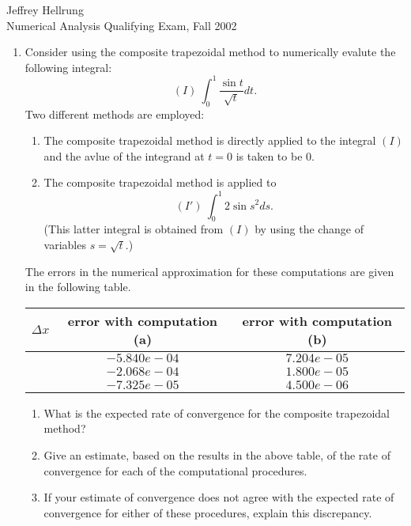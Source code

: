 \documentclass{article}
\begin{document}
\begin{flushright}
Jeffrey Hellrung \\
Numerical Analysis Qualifying Exam, Fall 2002 \\
\end{flushright}


\begin{enumerate}

\item Consider using the composite trapezoidal method to numerically evalute the following integral:
\[(I) \ \int_0^1 \frac{\sin t}{\sqrt{t}} dt.\]
Two different methods are employed:
\begin{enumerate}
\item The composite trapezoidal method is directly applied to the integral \((I)\) and the avlue of the integrand at \(t = 0\) is taken to be \(0\).
\item The composite trapezoidal method is applied to
\[(I') \ \int_0^1 2 \sin s^2 ds.\]
(This latter integral is obtained from \((I)\) by using the change of variables \(s = \sqrt{t}\).)
\end{enumerate}

The errors in the numerical approximation for these computations are given in the following table.

\begin{tabular}{c|c|c|}
\(\Delta x\) & error with computation (a) & error with computation (b) \\
\hline
 & \(-5.840e-04\) & \(7.204e-05\) \\
 & \(-2.068e-04\) & \(1.800e-05\) \\
 & \(-7.325e-05\) & \(4.500e-06\) \\
\end{tabular}

\begin{enumerate}
\item What is the expected rate of convergence for the composite trapezoidal method?

\item Give an estimate, based on the results in the above table, of the rate of convergence for each of the computational procedures.

\item If your estimate of convergence does not agree with the expected rate of convergence for either of these procedures, explain this discrepancy.

\end{enumerate}


\end{enumerate}
\end{document}
